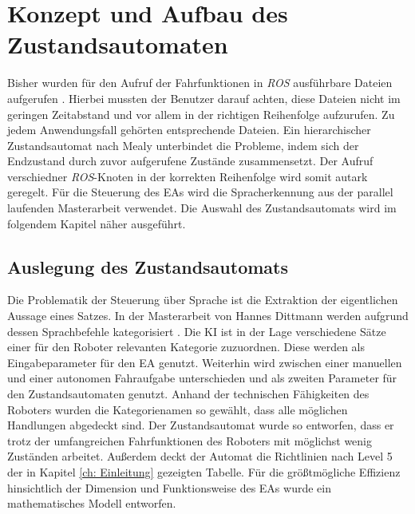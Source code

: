 	\section{Konzept und Aufbau des Zustandsautomaten}
	\label{sec: Umsetzung der Statemachine}
	Bisher wurden für den Aufruf der Fahrfunktionen in \textit{ROS} ausführbare Dateien aufgerufen \cite{Bachelorarbeit}. Hierbei mussten der Benutzer darauf achten, diese Dateien nicht im geringen Zeitabstand und vor allem in der richtigen Reihenfolge aufzurufen. Zu jedem Anwendungsfall gehörten entsprechende Dateien. Ein hierarchischer Zustandsautomat nach Mealy unterbindet die Probleme, indem sich der Endzustand durch zuvor aufgerufene Zustände zusammensetzt. Der Aufruf verschiedner \textit{ROS}-Knoten in der korrekten Reihenfolge wird somit autark geregelt. Für die Steuerung des EAs wird die Spracherkennung aus der parallel laufenden Masterarbeit verwendet. Die Auswahl des Zustandsautomats wird im folgendem Kapitel näher ausgeführt.\\	
	
	\subsection{Auslegung des Zustandsautomats}
	Die Problematik der Steuerung über Sprache ist die Extraktion der eigentlichen Aussage eines Satzes. In der Masterarbeit von Hannes Dittmann werden aufgrund dessen Sprachbefehle kategorisiert \cite{Dittmann}. Die KI ist in der Lage verschiedene Sätze einer für den Roboter relevanten Kategorie zuzuordnen. Diese werden als Eingabeparameter für den EA genutzt. Weiterhin wird zwischen einer manuellen und einer autonomen Fahraufgabe unterschieden und als zweiten Parameter für den Zustandsautomaten genutzt. Anhand der technischen Fähigkeiten des Roboters wurden die Kategorienamen so gewählt, dass alle möglichen Handlungen abgedeckt sind. Der Zustandsautomat wurde so entworfen, dass er trotz der umfangreichen Fahrfunktionen des Roboters mit möglichst wenig Zuständen arbeitet. Außerdem deckt der Automat die Richtlinien nach Level 5 der in Kapitel \ref{ch: Einleitung} gezeigten Tabelle. Für die größtmögliche Effizienz hinsichtlich der Dimension und Funktionsweise des EAs wurde ein mathematisches Modell entworfen.\\
	
